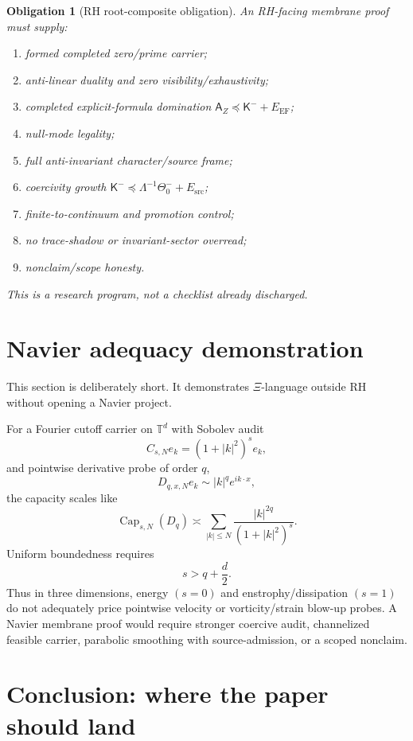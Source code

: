 \documentclass[11pt]{article}
\newtheorem{obligation}[theorem]{Obligation}
\DeclareMathOperator{\Capacity}{Cap}
\newcommand{\EF}{\mathrm{EF}}
\newcommand{\src}{\mathrm{src}}
\newcommand{\Loewner}{\preceq}
\begin{document}
\begin{obligation}[RH root-composite obligation]
An RH-facing membrane proof must supply:
\begin{enumerate}[label=O\arabic*.,leftmargin=2em]
  \item formed completed zero/prime carrier;
  \item anti-linear duality and zero visibility/exhaustivity;
  \item completed explicit-formula domination \(\mathsf A_Z\Loewner\mathsf K^-+E_{\EF}\);
  \item null-mode legality;
  \item full anti-invariant character/source frame;
  \item coercivity growth \(\mathsf K^-\Loewner\Lambda^{-1}\Theta_0^-+E_{\src}\);
  \item finite-to-continuum and promotion control;
  \item no trace-shadow or invariant-sector overread;
  \item nonclaim/scope honesty.
\end{enumerate}
This is a research program, not a checklist already discharged.
\end{obligation}

\section{Navier adequacy demonstration}

This section is deliberately short.  It demonstrates \(\Xi\)-language outside RH without opening a Navier project.

For a Fourier cutoff carrier on \(\mathbb T^d\) with Sobolev audit
\[
  C_{s,N}e_k=(1+|k|^2)^s e_k,
\]
and pointwise derivative probe of order \(q\),
\[
  D_{q,x,N}e_k\sim |k|^qe^{ik\cdot x},
\]
the capacity scales like
\[
  \Capacity_{s,N}(D_q)\asymp\sum_{|k|\le N}\frac{|k|^{2q}}{(1+|k|^2)^s}.
\]
Uniform boundedness requires
\[
  s>q+\frac d2.
\]
Thus in three dimensions, energy \((s=0)\) and enstrophy/dissipation \((s=1)\) do not adequately price pointwise velocity or vorticity/strain blow-up probes.  A Navier membrane proof would require stronger coercive audit, channelized feasible carrier, parabolic smoothing with source-admission, or a scoped nonclaim.

\section{Conclusion: where the paper should land}
\end{document}
